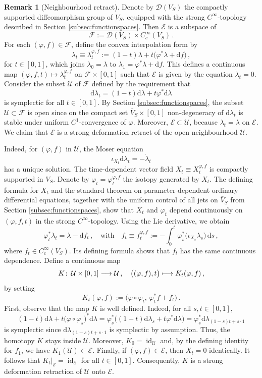\documentclass{amsart}
\theoremstyle{definition}
\newtheorem{rem}[prop]{Remark}
\def\co{\colon\thinspace}
\newcommand{\rmd}{\mathrm d}
\newcommand{\DD}{\mathcal D}
\newcommand{\EE}{\mathcal E}
\newcommand{\FF}{\mathcal F}
\newcommand{\UU}{\mathcal U}
\newcommand{\lra}{\longrightarrow}
\DeclareMathOperator{\id}{\mathrm{id}}
\begin{document}
\begin{rem}[Neighbourhood retract]
\label{rem:neighbourhoodretract}
Denote by $\DD(V_S)$
the compactly supported diffeomorphism group of $V_S$,
equipped with the strong $C^{\infty}$-topology
described in Section \ref{subsec:functionspaces}.
Then $\EE$ is a subspace of
\[
\FF:=\DD(V_S)\times C_c^{\infty}(V_S)
\,.
\]
For each $(\varphi,f)\in\FF$,
define the convex interpolation form by
\[
\lambda_t\equiv
\lambda_t^{\varphi,f}
:=(1-t)\lambda
+
t\big(\varphi^*\lambda+\rmd f\big)
\,,
\]
for $t\in[0,1]$,
which joins $\lambda_0=\lambda$
to $\lambda_1=\varphi^*\lambda+\rmd f$.
This defines a continuous map
$(\varphi,f,t)\mapsto\lambda_t^{\varphi,f}$
on $\FF\times[0,1]$
such that $\EE$ is given by the equation
$\dot\lambda_t=0$.
Consider the subset $\UU$ of $\FF$
defined by the requirement that
\[
\rmd\lambda_t
=(1-t)\rmd\lambda+t\varphi^*\rmd\lambda
\]
is symplectic for all $t\in[0,1]$.
By Section \ref{subsec:functionspaces},
the subset $\UU\subset\FF$ is open
since on the compact set $\bar{V}_S\times[0,1]$
non-degeneracy of $\rmd\lambda_t$
is stable under uniform $C^1$-convergence of $\varphi$.
Moreover,
$\EE\subset\UU$,
because $\lambda_t=\lambda$ on $\EE$.
We claim that $\EE$
is a strong deformation retract
of the open neighbourhood $\UU$.

Indeed, for $(\varphi,f)$ in $\UU$,
the Moser equation
\[
\iota_{X_t}\rmd\lambda_t=-\dot\lambda_t
\]
has a unique solution.
The time-dependent vector field
$X_t\equiv X_t^{\varphi,f}$
is compactly supported in $V_S$.
Denote by
$\varphi_t=\varphi_t^{\varphi,f}$
the isotopy generated by $X_t$.
The defining formula for $X_t$
and the standard theorem on parameter-dependent
ordinary differential equations,
together with the uniform control of all jets
on $\bar{V}_S$ from
Section \ref{subsec:functionspaces},
show that $X_t$ and $\varphi_t$
depend continuously on $(\varphi,f,t)$
in the strong $C^{\infty}$-topology.
Using the Lie derivative, we obtain
\[
\varphi_t^*\lambda_t=\lambda-\rmd f_t
\,,
\quad\text{with}\quad
f_t\equiv f_t^{\varphi,f}
:=-\int_0^t\varphi_s^*\bigl(\iota_{X_s}\lambda_s\bigr)\,\rmd s
\,,
\]
where
$f_t\in C_c^{\infty}(V_S)$.
Its defining formula shows that $f_t$
has the same continuous dependence.
Define a continuous map
	 \[
	 K\co\UU\times[0,1]\lra\UU
	 \,,\quad
	 \big((\varphi,f),t\big)\longmapsto
	 K_t(\varphi,f)
	 \,,
	 \]
by setting
\[
K_t(\varphi,f)
:=\Big(\varphi\circ\varphi_t,\,\varphi_t^*f+f_t\Big)
\,.
\]
First, observe that the map $K$ is well defined.
Indeed, for all $s,t\in[0,1]$,
\[
(1-t)\rmd\lambda+t\big(\varphi\circ\varphi_s\big)^*\rmd\lambda
=
\varphi_s^*\Big(
(1-t)\rmd\lambda_s+t\varphi^*\rmd\lambda
\Big)=
\varphi_s^*\rmd\lambda_{(1-s)t+s\cdot1}
\]
is symplectic since
$\rmd\lambda_{(1-s)t+s\cdot1}$
is symplectic by assumption.
Thus,
the homotopy $K$ stays inside $\UU$.
Moreover, $K_0=\id_{\UU}$ and, by the defining identity
for $f_1$, we have $K_1(\UU)\subset\EE$.
Finally,
if $(\varphi,f)\in\EE$, then $X_t=0$ identically.
It follows that $K_t|_{\EE}=\id_{\EE}$ for all $t\in[0,1]$.
Consequently,
$K$ is a strong deformation retraction
of $\UU$ onto $\EE$.


\end{rem}
\end{document}
